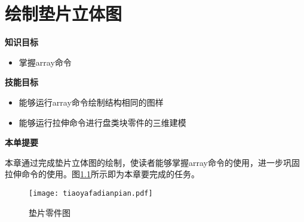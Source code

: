 \chapter{绘制垫片立体图}
{\bfseries 知识目标}
\begin{itemize}
\item 掌握array命令
\end{itemize}

{\bfseries 技能目标}
\begin{itemize}
\item 能够运行array命令绘制结构相同的图样
\item 能够运行拉伸命令进行盘类块零件的三维建模
\end{itemize}

{\bfseries 本单提要}

本章通过完成垫片立体图的绘制，使读者能够掌握array命令的使用，进一步巩固拉伸命令的使用。图\ref{fig:tiaoyafadianpian}所示即为本章要完成的任务。
\noindent
\begin{figure}[htbp]
\centering
\texttt{[image: tiaoyafadianpian.pdf]}
\caption{垫片零件图}\label{fig:tiaoyafadianpian}
\end{figure}

\endinput